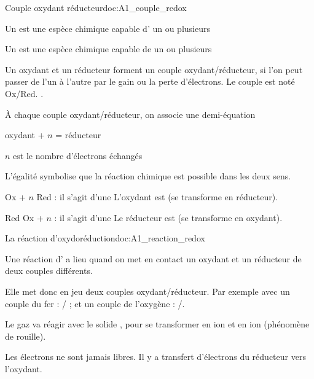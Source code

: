 \begin{doc}{Couple oxydant réducteur}{doc:A1_couple_redox}
  \begin{importants}  
    Un  est une espèce chimique capable d' un ou plusieurs 

    Un  est une espèce chimique capable de  un ou plusieurs 
  \end{importants}

  Un oxydant et un réducteur forment un couple oxydant/réducteur, si l'on peut passer de l'un à l'autre par le gain ou la perte d'électrons.
  Le couple est noté Ox/Red. .

  À chaque couple oxydant/réducteur, on associe une demi-équation
  \begin{center}
    oxydant + $n$  = réducteur

    $n$ est le nombre d'électrons échangés
  \end{center}
  \vspace*{-4pt}
  L'égalité symbolise que la réaction chimique est possible dans les deux sens.
  
  \begin{importants}
    \begin{listePoints}
      \item Ox + $n$  \!\!\reaction Red
      : il s'agit d'une 
      L'oxydant est  (se transforme en réducteur).
      \item  Red \!\!\reaction Ox + $n$ 
      : il s'agit d'une 
      Le réducteur est  (se transforme en oxydant).
    \end{listePoints}
  \end{importants}
\end{doc}

\begin{doc}{La réaction d'oxydoréduction}{doc:A1_reaction_redox}
  \begin{importants}
    Une réaction d' a lieu quand on met en contact un oxydant et un réducteur de deux couples différents.
  \end{importants}
  
  Elle met donc en jeu deux couples oxydant/réducteur.
  Par exemple avec un couple du fer : / ; et un couple de l'oxygène : /.

  Le gaz  va réagir avec le solide , pour se transformer en ion  et en ion  (phénomène de rouille).

  \begin{importants}
    Les électrons ne sont jamais libres.
    Il y a transfert d'électrons du réducteur vers l'oxydant.
  \end{importants}
\end{doc}

